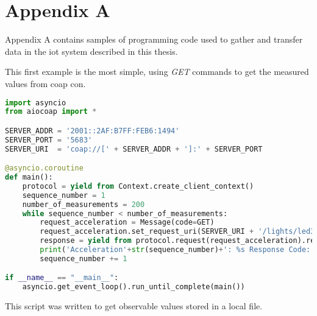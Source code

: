 \chapter{Appendix A}
\label{chp:appendix}

Appendix A contains samples of programming code used to gather and transfer data in the \gls{iot} system described in this thesis. 

This first example is the most simple, using \textit{GET} commands to get the measured values from \gls{coap} \gls{con}. 

\begin{lstlisting}[language=Python]
import asyncio
from aiocoap import *

SERVER_ADDR = '2001::2AF:B7FF:FEB6:1494'
SERVER_PORT = '5683'
SERVER_URI  = 'coap://[' + SERVER_ADDR + ']:' + SERVER_PORT

@asyncio.coroutine
def main():
	protocol = yield from Context.create_client_context()
	sequence_number = 1
	number_of_measurements = 200
	while sequence_number < number_of_measurements:
		request_acceleration = Message(code=GET)
		request_acceleration.set_request_uri(SERVER_URI + '/lights/led3')
		response = yield from protocol.request(request_acceleration).response
		print('Acceleration'+str(sequence_number)+': %s Response Code: %s\n'%(response.payload, response.code))		
		sequence_number += 1

if __name__ == "__main__":
	asyncio.get_event_loop().run_until_complete(main())

\end{lstlisting}

\newpage

This script was written to get observable values stored in a local file. 

